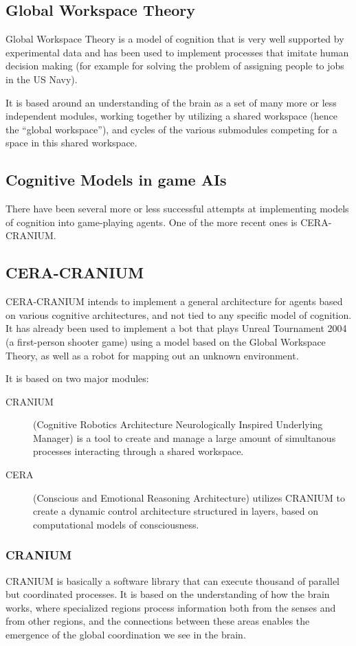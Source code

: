 \subsection{Global Workspace Theory}

Global Workspace Theory is a model of cognition that is very well supported
by experimental data and has been used to implement processes that imitate
human decision making (for example for solving the problem of assigning
people to jobs in the US Navy). 

It is based around an understanding of the brain as a set of many more or less
independent modules, working together by utilizing a shared workspace (hence the
``global workspace''), and cycles of the various submodules competing for a
space in this shared workspace.\cite{baars2005gwd}

\subsection{Cognitive Models in game AIs}
There have been several more or less successful attempts at implementing models
of cognition into game-playing agents. One of the more recent ones is
CERA-CRANIUM.


\subsection{CERA-CRANIUM}
CERA-CRANIUM intends to implement a general architecture for agents based on
various cognitive architectures, and not tied to any specific model of
cognition. It has already been used to implement a bot that plays Unreal
Tournament 2004 (a first-person shooter game) using a model based on the Global
Workspace Theory, as well as a robot for mapping out an unknown environment.
\cite{arrabales2009ceracranium}

It is based on two major modules:
\begin{description}
 \item [CRANIUM] (Cognitive Robotics Architecture Neurologically Inspired
Underlying Manager) is a tool to create and manage a large amount of
simultanous processes interacting through a shared workspace.
 \item [CERA] (Conscious and Emotional Reasoning Architecture)
 utilizes CRANIUM to create a dynamic control architecture structured in
layers, based on computational models of consciousness.
\end{description}

\subsubsection{CRANIUM}
CRANIUM is basically a software library that can execute thousand of parallel
but coordinated processes.
It is based on the understanding of how the brain works, where specialized
regions process information both from the senses and from other regions, and
the connections between these areas enables the emergence of the global
coordination we see in the brain.\cite{baars2005gwd}

